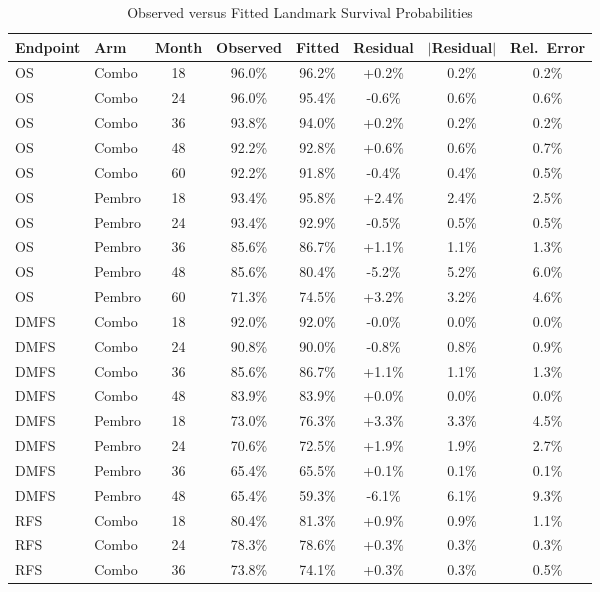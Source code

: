 \documentclass[11pt,a4paper]{article}
\begin{document}
\begin{table}[H]
\centering
\caption{Observed versus Fitted Landmark Survival Probabilities}
\label{tab:s15}
\small
\begin{tabular*}{\textwidth}{@{\extracolsep{\fill}}llcccccc}
\toprule
\textbf{Endpoint} & \textbf{Arm} & \textbf{Month} & \textbf{Observed} & \textbf{Fitted} & \textbf{Residual} & \textbf{$|$Residual$|$} & \textbf{Rel.\ Error} \\
\midrule
OS & Combo & 18 & 96.0\% & 96.2\% & +0.2\% & 0.2\% & 0.2\% \\
OS & Combo & 24 & 96.0\% & 95.4\% & -0.6\% & 0.6\% & 0.6\% \\
OS & Combo & 36 & 93.8\% & 94.0\% & +0.2\% & 0.2\% & 0.2\% \\
OS & Combo & 48 & 92.2\% & 92.8\% & +0.6\% & 0.6\% & 0.7\% \\
OS & Combo & 60 & 92.2\% & 91.8\% & -0.4\% & 0.4\% & 0.5\% \\
OS & Pembro & 18 & 93.4\% & 95.8\% & +2.4\% & 2.4\% & 2.5\% \\
OS & Pembro & 24 & 93.4\% & 92.9\% & -0.5\% & 0.5\% & 0.5\% \\
OS & Pembro & 36 & 85.6\% & 86.7\% & +1.1\% & 1.1\% & 1.3\% \\
OS & Pembro & 48 & 85.6\% & 80.4\% & -5.2\% & 5.2\% & 6.0\% \\
OS & Pembro & 60 & 71.3\% & 74.5\% & +3.2\% & 3.2\% & 4.6\% \\
DMFS & Combo & 18 & 92.0\% & 92.0\% & -0.0\% & 0.0\% & 0.0\% \\
DMFS & Combo & 24 & 90.8\% & 90.0\% & -0.8\% & 0.8\% & 0.9\% \\
DMFS & Combo & 36 & 85.6\% & 86.7\% & +1.1\% & 1.1\% & 1.3\% \\
DMFS & Combo & 48 & 83.9\% & 83.9\% & +0.0\% & 0.0\% & 0.0\% \\
DMFS & Pembro & 18 & 73.0\% & 76.3\% & +3.3\% & 3.3\% & 4.5\% \\
DMFS & Pembro & 24 & 70.6\% & 72.5\% & +1.9\% & 1.9\% & 2.7\% \\
DMFS & Pembro & 36 & 65.4\% & 65.5\% & +0.1\% & 0.1\% & 0.1\% \\
DMFS & Pembro & 48 & 65.4\% & 59.3\% & -6.1\% & 6.1\% & 9.3\% \\
RFS & Combo & 18 & 80.4\% & 81.3\% & +0.9\% & 0.9\% & 1.1\% \\
RFS & Combo & 24 & 78.3\% & 78.6\% & +0.3\% & 0.3\% & 0.3\% \\
RFS & Combo & 36 & 73.8\% & 74.1\% & +0.3\% & 0.3\% & 0.5\% \\

\end{tabular*}
\end{table}
\end{document}
